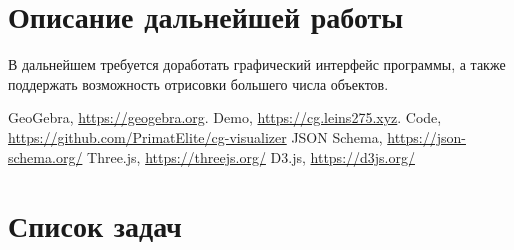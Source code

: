 \documentclass[12pt]{article}
\renewcommand{\listoffigures}{\begingroup  %
\tocsection
\tocfile{\listfigurename}{lof}
\endgroup}
\begin{document}
\pagebreak

\section{Описание дальнейшей работы} 

В дальнейшем требуется доработать графический  интерфейс программы, а также поддержать возможность отрисовки большего числа объектов.



\newpage

\listoffigures

\pagebreak

\begin{thebibliography}{5}


 GeoGebra, \url{https://geogebra.org}.
 Demo, \url{https://cg.leins275.xyz}.
 Code, \url{https://github.com/PrimatElite/cg-visualizer}
 JSON Schema, \url{https://json-schema.org/}
 Three.js, \url{https://threejs.org/}
 D3.js, \url{https://d3js.org/}


\end{thebibliography}

\newpage

\appendix
\section{Список задач}
\label{apx}
\end{document}

